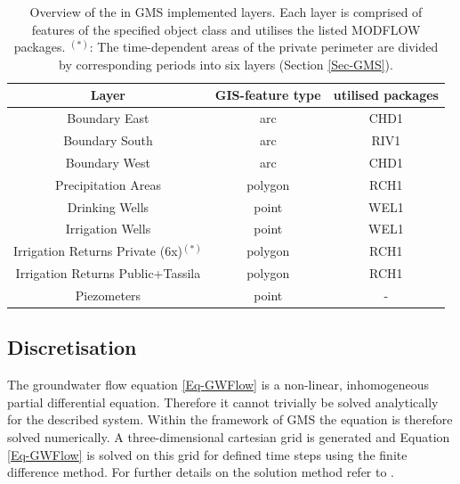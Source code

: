 \begin{table}[h]
    \centering
    \caption{Overview of the in GMS implemented layers. Each layer is comprised of features of the specified object class and utilises the listed MODFLOW packages. $^{(*)}$: The time-dependent areas of the private perimeter are divided by corresponding periods into six layers (Section \ref{Sec-GMS}).}
    \label{Tab-GMSLayersOV}
    \begin{tabular}{ccc}
        Layer                                   & GIS-feature type & utilised packages \\ \hline
        Boundary East                           & arc              & CHD1         \\
        Boundary South                          & arc              & RIV1         \\
        Boundary West                           & arc              & CHD1         \\
        Precipitation Areas                     & polygon          & RCH1              \\
        Drinking Wells                          & point            & WEL1              \\
        Irrigation Wells                        & point            & WEL1              \\
        Irrigation Returns Private (6x)$^{(*)}$ & polygon          & RCH1              \\
        Irrigation Returns Public+Tassila       & polygon          & RCH1              \\
        Piezometers                             & point            & -      
        \end{tabular}
\end{table}


\subsection{Discretisation}
\label{Sec-Discretisation}

The groundwater flow equation \eqref{Eq-GWFlow} is a non-linear, inhomogeneous partial differential equation. 
Therefore it cannot trivially be solved analytically for the described system. 
Within the framework of GMS the equation is therefore solved numerically. 
A three-dimensional cartesian grid is generated and Equation \eqref{Eq-GWFlow} is solved on this grid for defined time steps using the finite difference method. 
For further details on the solution method refer to \textcite{Harbaugh.2000}.


